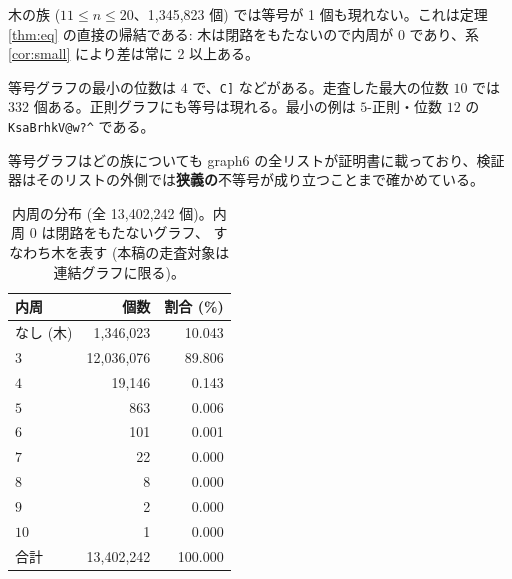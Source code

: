 \documentclass[paper=a4,fontsize=10.5pt,jafontsize=10.5pt]{jlreq}
\theoremstyle{plain}
\theoremstyle{definition}
\begin{document}
木の族 ($11 \le n \le 20$、1,345,823 個) では等号が 1 個も現れない。これは定理 \ref{thm:eq} の直接の帰結である: 木は閉路をもたないので内周が 0 であり、系 \ref{cor:small} により差は常に 2 以上ある。

等号グラフの最小の位数は $4$ で、\texttt{C]} などがある。走査した最大の位数 $10$ では 332 個ある。正則グラフにも等号は現れる。最小の例は $5$-正則・位数 $12$ の \texttt{KsaBrhkV@w?\textasciicircum{}} である。

等号グラフはどの族についても graph6 の全リストが証明書に載っており、検証器はそのリストの外側では\textbf{狭義の}不等号が成り立つことまで確かめている。

\begin{table}[htbp]
\centering
\caption{内周の分布 (全 13,402,242 個)。内周 $0$ は閉路をもたないグラフ、
すなわち木を表す (本稿の走査対象は連結グラフに限る)。}\label{tab:girth}
\begin{tabular}{lrr}
\toprule
内周 & 個数 & 割合 (\%) \\
\midrule
なし (木) & 1,346,023 & 10.043 \\
$3$ & 12,036,076 & 89.806 \\
$4$ & 19,146 & 0.143 \\
$5$ & 863 & 0.006 \\
$6$ & 101 & 0.001 \\
$7$ & 22 & 0.000 \\
$8$ & 8 & 0.000 \\
$9$ & 2 & 0.000 \\
$10$ & 1 & 0.000 \\
\midrule
合計 & 13,402,242 & 100.000 \\
\bottomrule
\end{tabular}
\end{table}
\end{document}
